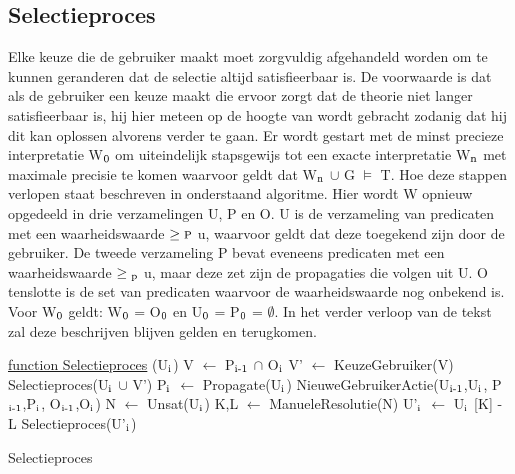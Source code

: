 \subsection{Selectieproces}
Elke keuze die de gebruiker maakt moet zorgvuldig afgehandeld worden om te kunnen geranderen dat de selectie altijd satisfieerbaar is. De voorwaarde is dat als de gebruiker een keuze maakt die ervoor zorgt dat de theorie niet langer satisfieerbaar is, hij hier meteen op de hoogte van wordt gebracht zodanig dat hij dit kan oplossen alvorens verder te gaan. Er wordt gestart met de minst precieze interpretatie W$\textsubscript{0}$ om uiteindelijk stapsgewijs tot een exacte interpretatie W$\textsubscript{n}$ met maximale precisie te komen waarvoor geldt dat W$\textsubscript{n}$ $\cup$ G $\models$ T. Hoe deze stappen verlopen staat beschreven in onderstaand algoritme. Hier wordt W opnieuw opgedeeld in drie verzamelingen U, P en O. U is de verzameling van predicaten met een waarheidswaarde $\geq\textsc{p}$ u, waarvoor geldt dat deze toegekend zijn door de gebruiker. De tweede verzameling P bevat eveneens predicaten met een waarheidswaarde $\geq\textsubscript{p}$ u, maar deze zet zijn de propagaties die volgen uit U. O tenslotte is de set van predicaten waarvoor de waarheidswaarde nog onbekend is. Voor W$\textsubscript{0}$ geldt: W$\textsubscript{0}$ = O$\textsubscript{0}$ en U$\textsubscript{0}$ = P$\textsubscript{0}$ = $\emptyset$. In het verder verloop van de tekst zal deze beschrijven blijven gelden en terugkomen.

\begin{algorithm}
	\underline{function Selectieproces} (U$\textsubscript{i}$)\;
	\Output{}
		{
		V $\leftarrow$ P$\textsubscript{i-1}$ $\cap$ O$\textsubscript{i}$\;
			{
			V' $\leftarrow$ KeuzeGebruiker(V)\; 
			Selectieproces(U$\textsubscript{i}$ $\cup$ V')\;
			}
			{
			P$\textsubscript{i}$ $\leftarrow$ Propagate(U$\textsubscript{i}$)\;	
			NieuweGebruikerActie(U$\textsubscript{i-1}$,U$\textsubscript{i}$,
			P$\textsubscript{i-1}$,P$\textsubscript{i}$,
			O$\textsubscript{i-1}$,O$\textsubscript{i}$)\;
			}
		}
		{
		N $\leftarrow$ Unsat(U$\textsubscript{i}$)\; 
		K,L $\leftarrow$ ManueleResolutie(N)\;
		U'$\textsubscript{i}$ $\leftarrow$ U$\textsubscript{i}$ 
		[K] - L\; 
		Selectieproces(U'$\textsubscript{i}$)\;
		}
	\caption{Selectieproces}
\end{algorithm}

